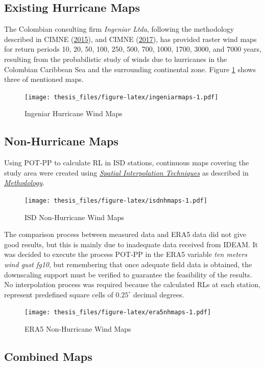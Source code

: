 \documentclass[12pt,oneside]{reedthesis}
\begin{document}
\hypertarget{existing-hurricane-maps}{%
\subsection{Existing Hurricane Maps}\label{existing-hurricane-maps}}

The Colombian consulting firm \emph{Ingeniar Ltda}, following the methodology described in CIMNE (\protect\hyperlink{ref-hurricanemaps}{2015}), and CIMNE (\protect\hyperlink{ref-hurricanemaps2}{2017}), has provided raster wind maps for return periods 10, 20, 50, 100, 250, 500, 700, 1000, 1700, 3000, and 7000 years, resulting from the probabilistic study of winds due to hurricanes in the Colombian Caribbean Sea and the surrounding continental zone. Figure \ref{fig:ingeniarmaps} shows three of mentioned maps.
\begin{figure}
\centering
\texttt{[image: thesis\_files/figure-latex/ingeniarmaps-1.pdf]}
\caption{\label{fig:ingeniarmaps}Ingeniar Hurricane Wind Maps}
\end{figure}
\hypertarget{non-hurricane-maps}{%
\subsection{Non-Hurricane Maps}\label{non-hurricane-maps}}

Using POT-PP to calculate RL in ISD stations, continuous maps covering the study area were created using \emph{\protect\hyperlink{si}{Spatial Interpolation Techniques}} as described in \emph{\protect\hyperlink{rmd-method}{Methodology}}.
\begin{figure}
\centering
\texttt{[image: thesis\_files/figure-latex/isdnhmaps-1.pdf]}
\caption{\label{fig:isdnhmaps}ISD Non-Hurricane Wind Maps}
\end{figure}
The comparison process between measured data and ERA5 data did not give good results, but this is mainly due to inadequate data received from IDEAM. It was decided to execute the process POT-PP in the ERA5 variable \emph{ten meters wind gust fg10}, but remembering that once adequate field data is obtained, the downscaling support must be verified to guarantee the feasibility of the results. No interpolation process was required because the calculated RLs at each station, represent predefined square cells of \(0.25^\circ\) decimal degrees.
\begin{figure}
\centering
\texttt{[image: thesis\_files/figure-latex/era5nhmaps-1.pdf]}
\caption{\label{fig:era5nhmaps}ERA5 Non-Hurricane Wind Maps}
\end{figure}
\hypertarget{cm}{%
\subsection{Combined Maps}\label{cm}}
\end{document}
